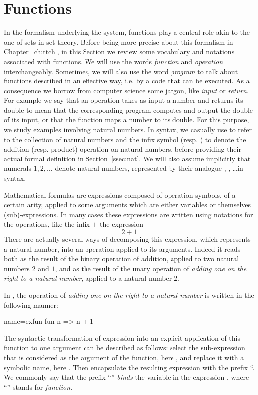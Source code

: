\section{Functions}
In the formalism underlying the \Coq{} system, functions play a
central role akin to the one of sets in set theory. Before being more
precise about this formalism in Chapter~\ref{ch:ttch}, in this Section
we review some vocabulary and notations associated with functions.
We will use the words \emph{function} and \emph{operation}
interchangeably. Sometimes, we will also use the word \emph{program}
to talk about functions described in an effective way, i.e. by a code
that can be executed. As a consequence we borrow from computer science
some jargon, like \emph{input} or \emph{return}. For example we say that
an operation takes as input a number and returns its double to mean
that the corresponding program computes and output the double of its
input, or that the function maps a number to its double. For
this purpose, we study examples involving natural numbers. In \Coq{}
syntax, we casually use  to refer to the collection of natural
numbers and the infix symbol  \C{+} (resp. \C{*}) to denote the  addition
(resp. product) operation on natural numbers,  before providing their
actual formal definition in Section~\ref{ssec:nat}. We will also
assume implicitly that numerals $1, 2, \dots$ denote natural numbers,
represented by their analogue , , \dots in \Coq{} syntax.


Mathematical formulas are expressions composed of operation symbols,
of a certain arity, applied to some arguments which are
either variables or themselves (sub)-expressions.
In many cases these
expressions are written using notations for the operations, like the
infix $+$ the expression
\[ 2 + 1 \]
There are actually several ways of decomposing this expression, which
represents a natural number, into an operation applied to its arguments.
Indeed it reads both as  the result of the binary operation
of addition, applied to two natural numbers $2$ and $1$, and as the
result of the unary operation of {\em adding one on the right to a
  natural number}, applied to a natural number $2$.

In \Coq{}, the operation of {\em adding one on the right to a natural number} is
written in the following manner:

\begin{coq}{name=exfun}{}
  fun n => n + 1
\end{coq}
The syntactic transformation of expression  into an
explicit application of this function to one argument can be
described as follows: select the sub-expression that is considered as
the argument of the function, here , and replace it with a
symbolic name, here . Then encapsulate the resulting expression
 with the prefix ``. We commonly
say that the prefix ``'' \emph{binds} the variable  in the
expression , where ``'' stands for
\emph{function}.

